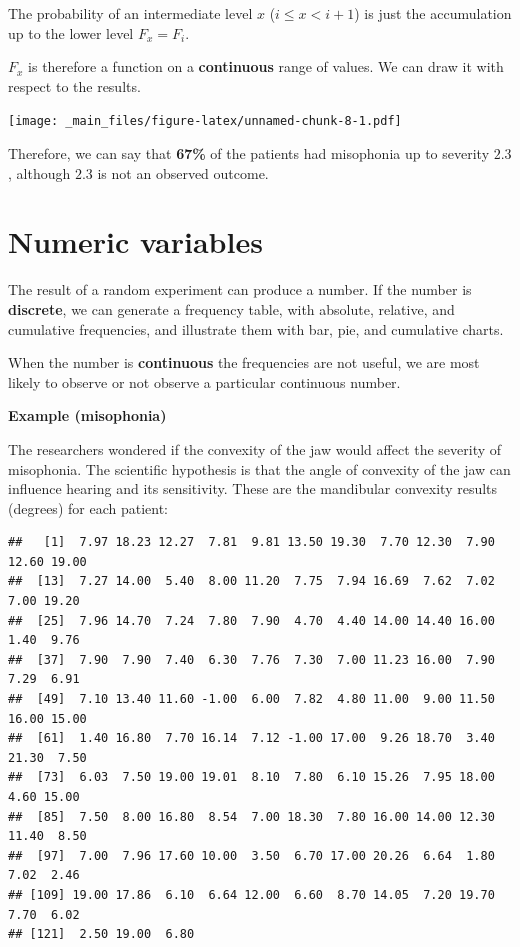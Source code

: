 \documentclass[
]{book}
\begin{document}
The probability of an intermediate level \(x\) (\(i\leq x< i+1\)) is just the accumulation up to the lower level \(F_x = F_i\).

\(F_x\) is therefore a function on a \textbf{continuous} range of values. We can draw it with respect to the results.

\texttt{[image: \_main\_files/figure-latex/unnamed-chunk-8-1.pdf]}

Therefore, we can say that \textbf{67\%} of the patients had misophonia up to severity \(2.3\), although \(2.3\) is not an observed outcome.

\hypertarget{numeric-variables}{%
\section{Numeric variables}\label{numeric-variables}}

The result of a random experiment can produce a number. If the number is \textbf{discrete}, we can generate a frequency table, with absolute, relative, and cumulative frequencies, and illustrate them with bar, pie, and cumulative charts.

When the number is \textbf{continuous} the frequencies are not useful, we are most likely to observe or not observe a particular continuous number.

\textbf{Example (misophonia)}

The researchers wondered if the convexity of the jaw would affect the severity of misophonia. The scientific hypothesis is that the angle of convexity of the jaw can influence hearing and its sensitivity. These are the mandibular convexity results (degrees) for each patient:

\begin{verbatim}
##   [1]  7.97 18.23 12.27  7.81  9.81 13.50 19.30  7.70 12.30  7.90 12.60 19.00
##  [13]  7.27 14.00  5.40  8.00 11.20  7.75  7.94 16.69  7.62  7.02  7.00 19.20
##  [25]  7.96 14.70  7.24  7.80  7.90  4.70  4.40 14.00 14.40 16.00  1.40  9.76
##  [37]  7.90  7.90  7.40  6.30  7.76  7.30  7.00 11.23 16.00  7.90  7.29  6.91
##  [49]  7.10 13.40 11.60 -1.00  6.00  7.82  4.80 11.00  9.00 11.50 16.00 15.00
##  [61]  1.40 16.80  7.70 16.14  7.12 -1.00 17.00  9.26 18.70  3.40 21.30  7.50
##  [73]  6.03  7.50 19.00 19.01  8.10  7.80  6.10 15.26  7.95 18.00  4.60 15.00
##  [85]  7.50  8.00 16.80  8.54  7.00 18.30  7.80 16.00 14.00 12.30 11.40  8.50
##  [97]  7.00  7.96 17.60 10.00  3.50  6.70 17.00 20.26  6.64  1.80  7.02  2.46
## [109] 19.00 17.86  6.10  6.64 12.00  6.60  8.70 14.05  7.20 19.70  7.70  6.02
## [121]  2.50 19.00  6.80
\end{verbatim}
\end{document}
